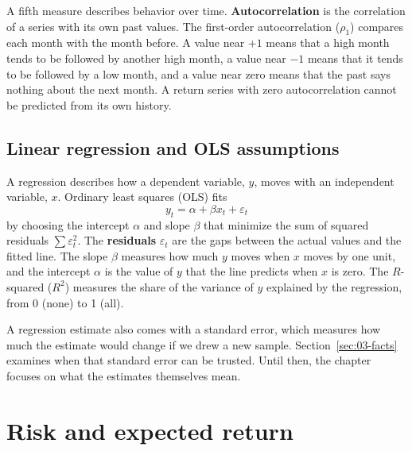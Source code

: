 A fifth measure describes behavior over time. \textbf{Autocorrelation} is the correlation of a series with its own past values. The first-order autocorrelation ($\rho_1$) compares each month with the month before. A value near $+1$ means that a high month tends to be followed by another high month, a value near $-1$ means that it tends to be followed by a low month, and a value near zero means that the past says nothing about the next month. A return series with zero autocorrelation cannot be predicted from its own history.

\subsection{Linear regression and OLS assumptions}
\label{sec:03-regression}
A regression describes how a dependent variable, $y$, moves with an independent variable, $x$. Ordinary least squares (OLS) fits
\begin{equation}
  y_t = \alpha + \beta x_t + \varepsilon_t
  \label{eq:03-ols}
\end{equation}
by choosing the intercept $\alpha$ and slope $\beta$ that minimize the sum of squared residuals $\sum \varepsilon_t^2$. The \textbf{residuals} $\varepsilon_t$ are the gaps between the actual values and the fitted line. The slope $\beta$ measures how much $y$ moves when $x$ moves by one unit, and the intercept $\alpha$ is the value of $y$ that the line predicts when $x$ is zero. The $R$-squared ($R^2$) measures the share of the variance of $y$ explained by the regression, from 0 (none) to 1 (all).

A regression estimate also comes with a standard error, which measures how much the estimate would change if we drew a new sample. Section~\ref{sec:03-facts} examines when that standard error can be trusted. Until then, the chapter focuses on what the estimates themselves mean.

\section{Risk and expected return}
\label{sec:03-decomposition}


